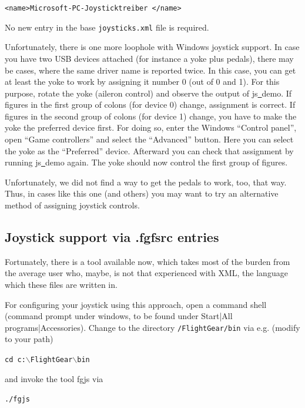  \texttt{<name>Microsoft-PC-Joysticktreiber </name>}
 \medskip

\noindent
No new entry in the base \texttt{joysticks.xml} file is required.

Unfortunately, there is one more loophole with Windows joystick support. In
case you have two USB devices attached (for instance a yoke plus pedals),
there may be cases, where the same driver name is reported twice. In this
case, you can get at least the yoke to work by assigning it number 0 (out of
0 and 1). For this purpose, rotate the yoke (aileron control) and observe
the output of js\underline{~}demo. If figures in the first group of colons
(for device 0) change, assignment is correct. If figures in the second group
of colons (for device 1) change, you have to make the yoke the preferred
device first. For doing so, enter the
Windows ``Control panel'', open ``Game controllers'' and select the
``Advanced'' button. Here you can select the yoke as the ``Preferred''
device. Afterward you can check that assignment by running
js\underline{~}demo again. The yoke should now control the first group of
figures.

Unfortunately, we did not find a way to get the pedals to work, too, that way. Thus, in cases like this one (and others) you may want to try an alternative method of assigning joystick controls.


\subsection{Joystick support via .fgfsrc entries\label{fgfsrcjoy}}
Fortunately, there is a tool available now, which takes most of the burden from the average user who, maybe, is not that experienced with XML, the language which these files are written in.

For configuring your joystick using this approach, open a command shell (command prompt under windows, to be found under Start|All programs|Accessories). Change to the directory \texttt{/FlightGear/bin} via e.g. (modify to your path) 

\noindent
\texttt{cd c:$\backslash$FlightGear$\backslash$bin}

and invoke the tool fgjs via

\noindent
\texttt{./fgjs}

